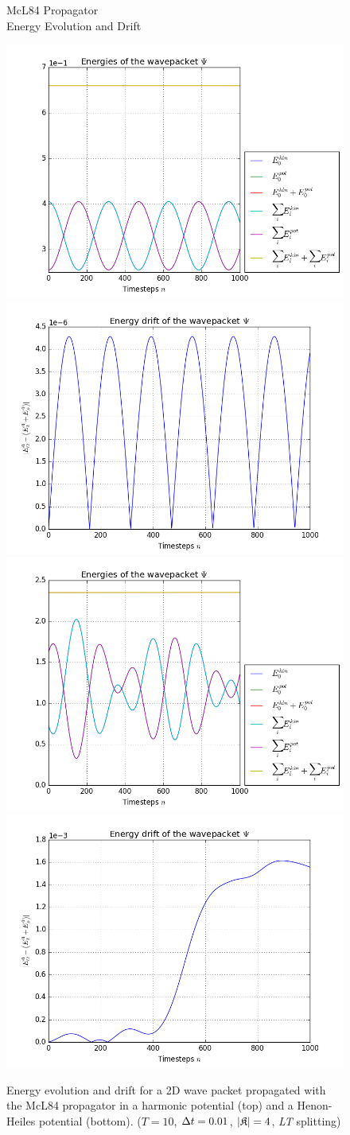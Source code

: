 \begin{figure}[ht]
	\centering
	\begin{minipage}[c]{\textwidth}
		\begin{center}
			\large McL84 Propagator \\[1mm]
			\normalsize Energy Evolution and Drift
			\vspace{4mm}
		\end{center}
	\end{minipage}
	\includegraphics[width=.45\textwidth]{figures/harmonic_energies_McL84.png}
	\includegraphics[width=.45\textwidth]{figures/harmonic_drift_McL84.png} \\
	\includegraphics[width=.45\textwidth]{figures/henon_energies_McL84.png}
	\includegraphics[width=.45\textwidth]{figures/henon_drift_McL84.png}
	\caption{Energy evolution and drift for a 2D wave packet propagated with the McL84 propagator in a harmonic potential (top) and a Henon-Heiles potential (bottom).
	($T = 10$, $\Delta t = 0.01$, $| \mathfrak{K} | = 4$, \emph{LT} splitting)}
	\label{fig:energy_McL84}
\end{figure}

